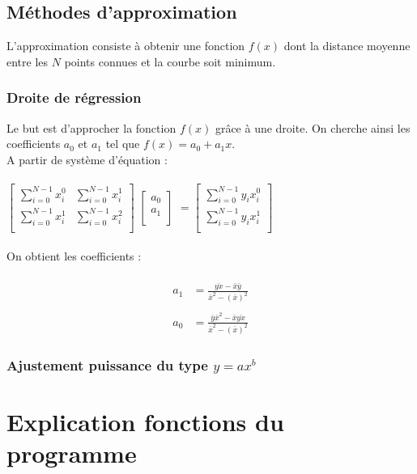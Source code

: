 \documentclass[12pt,french,titlepage]{article}
\begin{document}
	\subsection{Méthodes d'approximation}
	
	L'approximation consiste à obtenir une fonction $f(x)$ dont la distance moyenne entre les $N$ points connues et la courbe soit minimum.\\
	
	\subsubsection{Droite de régression}
	Le but est d'approcher la fonction $f(x)$ grâce à une droite. On cherche ainsi les coefficients $a_0$ et $a_1$ tel que $f(x)=a_0+a_1x$.\\
	A partir de système d'équation :\\\\
	$	
		\begin{bmatrix}
		\sum_{i=0}^{N-1}x_i^0&\sum_{i=0}^{N-1}x_i^1\\
		\sum_{i=0}^{N-1}x_i^1&\sum_{i=0}^{N-1}x_i^2\\
		\end{bmatrix}
	$
	$	
		\begin{bmatrix}
		a_0\\a_1\\
		\end{bmatrix}
	$
	$	
		=
		\begin{bmatrix}
		\sum_{i=0}^{N-1}y_ix_i^0\\
		\sum_{i=0}^{N-1}y_ix_i^1\\
		\end{bmatrix}
	$
	\\\\
	On obtient les coefficients :\\\\
	\begin{align*}
		a_1&=\frac{\bar{yx}-\bar{x}\bar{y}}{\bar{x}^2-(\bar{x})^2}\\\\
		a_0&=\frac{\bar{y}\bar{x}^2-\bar{x}\bar{yx}}{\bar{x}^2-(\bar{x})^2}
	\end{align*}
	\subsubsection{Ajustement puissance du type $y = ax^b$}
	
	\section{Explication fonctions du programme}
	
\end{document}
